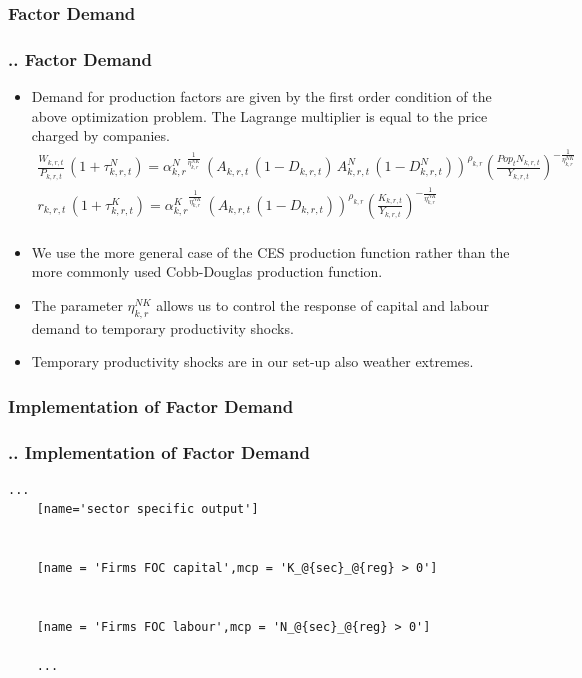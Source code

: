 \documentclass[11pt,aspectratio=169]{beamer}
\begin{document}
\subsubsection{Factor Demand}
\begin{frame}
	\frametitle{{\thesection.\thesubsection.\thesubsubsection} Factor Demand}
	\scriptsize
	\begin{itemize}
		\item Demand for production factors are given by the first order condition of the above optimization problem. The Lagrange multiplier is equal to the price charged by companies. 
		\begin{align*}
		\frac{W_{k,r,t}}{P_{k,r,t}}  \, (1 + \tau^{N}_{k,r,t}) = {\alpha^{N}_{k,r}}^{\frac{1}{\eta^{NK}_{k,r}}} \, \left(A_{k,r,t} \, (1 - D_{k,r,t}) \, A^N_{k,r,t} \, (1 - D^N_{k,r,t})\right)^{\rho_{k,r}} \left(\frac{Pop_{t} N_{k,r,t}}{Y_{k,r,t}}\right)^{-\frac{1}{\eta^{NK}_{k,r}}} \nonumber \\ 
		r_{k,r,t} \, (1 + \tau^{K}_{k,r,t}) = {\alpha^{K}_{k,r}}^{\frac{1}{\eta^{NK}_{k,r}}} \, \left(A_{k,r,t} \, (1 - D_{k,r,t})\right)^{\rho_{k,r}}\left(\frac{K_{k,r,t}}{Y_{k,r,t}} \right)^{-\frac{1}{\eta^{NK}_{k,r}}} \\ 
		\end{align*}
		\item We use the more general case of the CES production function rather than the more commonly used Cobb-Douglas production function. 
		\item The parameter $\eta^{NK}_{k,r}$ allows us to control the response of capital and labour demand to temporary productivity shocks. 
		\item Temporary productivity shocks are in our set-up also weather extremes. 
	\end{itemize}
\end{frame}

\subsubsection{Implementation of Factor Demand}
\begin{frame}[fragile]
	\frametitle{{\thesection.\thesubsection.\thesubsubsection} Implementation of Factor Demand}	
	\begin{lstlisting}[frame = single]
	...
	[name='sector specific output']
	
	
	[name = 'Firms FOC capital',mcp = 'K_@{sec}_@{reg} > 0']
	
	
	[name = 'Firms FOC labour',mcp = 'N_@{sec}_@{reg} > 0']
	
	...
	\end{lstlisting}
\end{frame}
\end{document}
